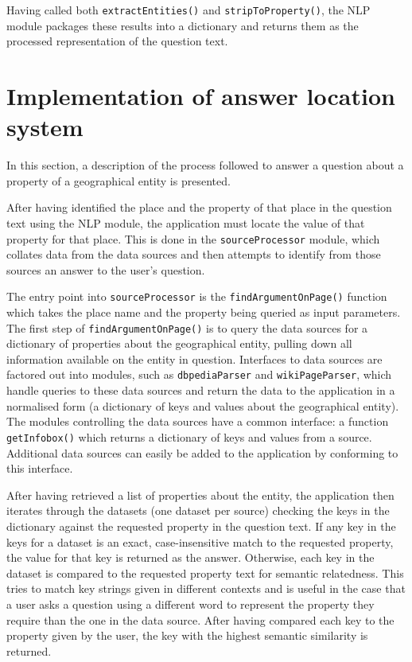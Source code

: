 \documentclass[authoryearcitations]{UoYCSproject}
\begin{document}
Having called both \texttt{extractEntities()} and \texttt{stripToProperty()}, the NLP module packages these results into a dictionary and returns them as the processed representation of the question text.

\section{Implementation of answer location system}
\label{sec:implementationOfAnswerLocationSys}
In this section, a description of the process followed to answer a question about a property of a geographical entity is presented. 

After having identified the place and the property of that place in the question text using the NLP module, the application must locate the value of that property for that place. This is done in the \texttt{sourceProcessor} module, which collates data from the data sources and then attempts to identify from those sources an answer to the user's question.

The entry point into \texttt{sourceProcessor} is the \texttt{findArgumentOnPage()} function which takes the place name and the property being queried as input parameters. The first step of \texttt{findArgumentOnPage()} is to query the data sources for a dictionary of properties about the geographical entity, pulling down all information available on the entity in question. Interfaces to data sources are factored out into modules, such as \texttt{dbpediaParser} and \texttt{wikiPageParser}, which handle queries to these data sources and return the data to the application in a normalised form (a dictionary of keys and values about the geographical entity). The modules controlling the data sources have a common interface: a function \texttt{getInfobox()} which returns a dictionary of keys and values from a source. Additional data sources can easily be added to the application by conforming to this interface.

After having retrieved a list of properties about the entity, the application then iterates through the datasets (one dataset per source) checking the keys in the dictionary against the requested property in the question text. If any key in the keys for a dataset is an exact, case-insensitive match to the requested property, the value for that key is returned as the answer. Otherwise, each key in the dataset is compared to the requested property text for semantic relatedness. This tries to match key strings given in different contexts and is useful in the case that a user asks a question using a different word to represent the property they require than the one in the data source. After having compared each key to the property given by the user, the key with the highest semantic similarity is returned. 
\end{document}
